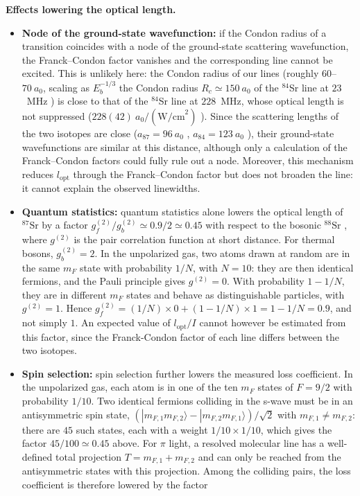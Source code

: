 \textbf{Effects lowering the optical length.}
\begin{itemize}
    \item \textbf{Node of the ground-state wavefunction:} if the Condon radius of a
    transition coincides with a node of the ground-state scattering wavefunction, the
    Franck--Condon factor vanishes and the corresponding line cannot be excited. This is
    unlikely here: the Condon radius of our lines (roughly $60$--$70~a_0$, scaling as $E_b^{-1/3}$
    the Condon radius $R_c\simeq150~a_0$ of the $^{84}$Sr line at $23$~MHz
    \cite{reschovsky_narrow-line_2018}) is close to that of the $^{84}$Sr line at $228$~MHz, whose
    optical length is not suppressed ($228(42)~a_0/(\text{W/cm}^2)$ \cite{reschovsky_narrow-line_2018}).
    Since the scattering lengths of the two isotopes are close ($a_{87}=96~a_0$
    \cite{hill_photoassociative_2021}, $a_{84}=123~a_0$ \cite{reschovsky_narrow-line_2018}), their
    ground-state wavefunctions are similar at this distance, although only a calculation of the
    Franck--Condon factors could fully rule out a node. Moreover, this mechanism reduces
    $l_{\text{opt}}$ through the Franck--Condon factor but does not broaden the line: it cannot
    explain the observed linewidths.
    \item \textbf{Quantum statistics:} quantum statistics alone lowers the optical length of $^{87}\text{Sr}$ by a factor
    $g^{(2)}_f/g^{(2)}_b\simeq0.9/2\simeq0.45$ with respect to the bosonic $^{88}\text{Sr}$
    \cite{hill_photoassociative_2021}, where $g^{(2)}$ is the pair correlation function at short
    distance. For thermal bosons, $g^{(2)}_b=2$. In the unpolarized gas, two atoms drawn at random
    are in the same $m_F$ state with probability $1/N$, with $N=10$: they are then identical fermions,
    and the Pauli principle gives $g^{(2)}=0$. With probability $1-1/N$, they are in different $m_F$
    states and behave as distinguishable particles, with $g^{(2)}=1$. Hence
    $g^{(2)}_f=(1/N)\times0+(1-1/N)\times1=1-1/N=0.9$, and not simply $1$. An expected value of
    $l_{\text{opt}}/I$ cannot however be estimated from this factor, since the Franck-Condon factor of
    each line differs between the two isotopes.
    \item \textbf{Spin selection:} spin selection further lowers the measured loss coefficient. In the unpolarized gas, each atom is in one of the ten $m_F$ states of $F=9/2$ with probability $1/10$. Two identical fermions colliding in the s-wave must be in an antisymmetric spin state, $(|m_{F,1}m_{F,2}\rangle-|m_{F,2}m_{F,1}\rangle)/\sqrt2$ with $m_{F,1}\neq m_{F,2}$: there are $45$ such states, each with a weight $1/10\times1/10$, which gives the factor $45/100\simeq0.45$ above. For $\pi$ light, a resolved molecular line has a well-defined total projection $T=m_{F,1}+m_{F,2}$ and can only be reached from the antisymmetric states with this projection. Among the colliding pairs, the loss coefficient is therefore lowered by the factor

\end{itemize}
